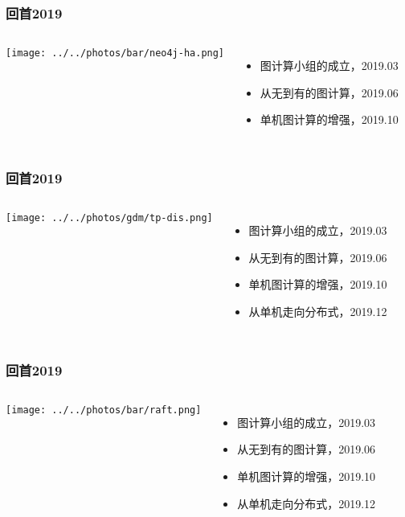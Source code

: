 \documentclass{beamer}
\begin{document}
  \begin{frame}
    \frametitle{回首2019}
  \begin{columns}
  \texttt{[image: ../../photos/bar/neo4j-ha.png]}

  \begin{itemize}
  \item 图计算小组的成立，2019.03
  \item 从无到有的图计算，2019.06
  \item 单机图计算的增强，2019.10
  \end{itemize}
  \end{columns}

  \end{frame}


  \begin{frame}
    \frametitle{回首2019}
  \begin{columns}
  \texttt{[image: ../../photos/gdm/tp-dis.png]}

  \begin{itemize}
  \item 图计算小组的成立，2019.03
  \item 从无到有的图计算，2019.06
  \item 单机图计算的增强，2019.10
  \item 从单机走向分布式，2019.12
  \end{itemize}
  \end{columns}

  \end{frame}

  \begin{frame}
    \frametitle{回首2019}
  \begin{columns}
  \texttt{[image: ../../photos/bar/raft.png]}

  \begin{itemize}
  \item 图计算小组的成立，2019.03
  \item 从无到有的图计算，2019.06
  \item 单机图计算的增强，2019.10
  \item 从单机走向分布式，2019.12
  \end{itemize}
  \end{columns}

  \end{frame}
\end{document}
